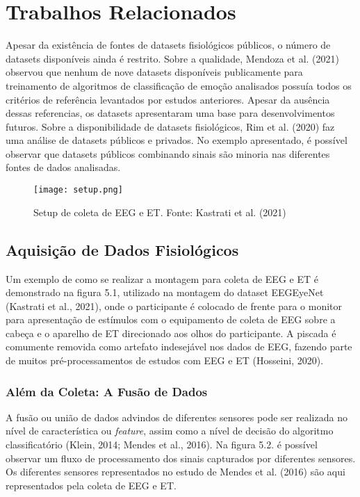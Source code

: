 \chapter{Trabalhos Relacionados}


Apesar da existência de fontes de datasets fisiológicos públicos, 
o número de datasets disponíveis ainda é restrito. Sobre a qualidade, 
Mendoza et al. (2021) observou que nenhum de nove datasets disponíveis publicamente para 
treinamento de algoritmos de classificação de emoção analisados possuía todos os critérios de 
referência levantados por estudos anteriores. Apesar da ausência dessas referencias, os datasets 
apresentaram uma base para desenvolvimentos futuros. Sobre a disponibilidade de datasets fisiológicos,
Rim et al. (2020) faz uma análise de datasets públicos e privados. No exemplo apresentado, 
é possível observar que datasets públicos combinando sinais são minoria nas diferentes fontes de dados analisadas. 

 \begin{figure}
      \centering
      \texttt{[image: setup.png]}
      \caption{Setup de coleta de EEG e ET. Fonte: Kastrati et al. (2021)}
\end{figure}

\section{Aquisição de Dados Fisiológicos}

Um exemplo de como se realizar a montagem para coleta de EEG e ET é demonstrado na figura 5.1, 
utilizado na montagem do dataset EEGEyeNet (Kastrati et al., 2021),
onde o participante é colocado de frente para o monitor para apresentação de estímulos com o 
equipamento de coleta de EEG sobre a cabeça e o aparelho de ET direcionado aos olhos do participante. 
A piscada é comumente removida como artefato indesejável nos dados de EEG, fazendo parte de muitos pré-processamentos de estudos com EEG e ET (Hosseini, 2020).



\subsection{Além da Coleta: A Fusão de Dados}
A fusão ou união de dados advindos de diferentes sensores pode ser realizada no nível de característica ou \textit{feature},
assim como a nível de decisão do algoritmo classificatório (Klein, 2014; Mendes et al., 2016).
      Na figura 5.2. é possível observar um fluxo de processamento dos sinais capturados por diferentes sensores.  Os diferentes 
      sensores representados no estudo de Mendes et al. (2016) são aqui representados pela coleta de EEG e ET.
 
